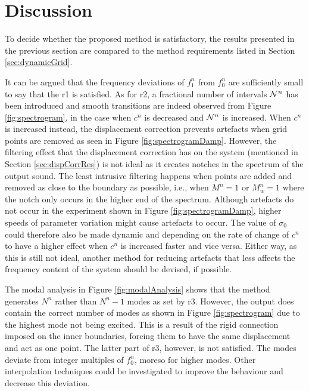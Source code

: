 \section{Discussion}\label{sec:discussion}
To decide whether the proposed method is satisfactory, the results presented in the previous section are compared to the method requirements listed in Section \ref{sec:dynamicGrid}.%

It can be argued that the frequency deviations of $f_1^n$ from $f_0^n$ are sufficiently small to say that the r1 is satisfied. As for r2, a fractional number of intervals $\mathcal{N}^n$ has been introduced and smooth transitions are indeed observed from Figure \ref{fig:spectrogram}, in the case when $c^n$ is decreased and $\mathcal{N}^n$ is increased. When $c^n$ is increased instead, the displacement correction prevents artefacts when grid points are removed as seen in Figure \ref{fig:spectrogramDamp}. However, the filtering effect that the displacement correction has on the system (mentioned in Section \ref{sec:dispCorrRes}) is not ideal as it creates notches in the spectrum of the output sound. The least intrusive filtering happens when points are added and removed as close to the boundary as possible, i.e., when $M^n = 1$ or $M_w^n = 1$ where the notch only occurs in the higher end of the spectrum. Although artefacts do not occur in the experiment shown in Figure \ref{fig:spectrogramDamp}, higher speeds of parameter variation might cause artefacts to occur. The value of $\sigma_0$ could therefore also be made dynamic and depending on the rate of change of $c^n$ to have a higher effect when $c^n$ is increased faster and vice versa.
Either way, as this is still not ideal, another method for reducing artefacts that less affects the frequency content of the system should be devised, if possible. 

The modal analysis in Figure \ref{fig:modalAnalysis} shows that the method generates $N^n$ rather than $N^n - 1$ modes as set by r3. However, the output does contain the correct number of modes as shown in Figure \ref{fig:spectrogram} due to the highest mode not being excited. This is a result of the rigid connection imposed on the inner boundaries, forcing them to have the same displacement and act as one point. %
%
The latter part of r3, however, is not satisfied. The modes deviate from integer multiples of $f_0^n$, moreso for higher modes. Other interpolation techniques could be investigated to improve the behaviour and decrease this deviation.

